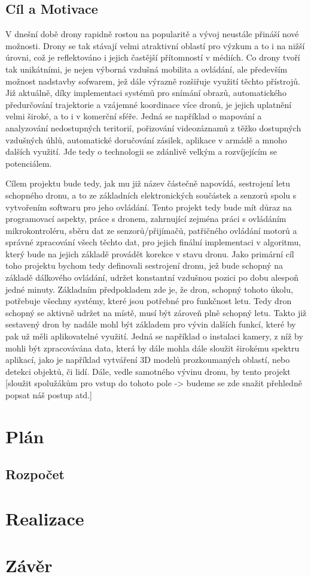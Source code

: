 \documentclass[12pt]{report}
\begin{document}
\section{Cíl a Motivace}
V dnešní době drony rapidně rostou na popularitě a vývoj neustále přináší nové možnosti. Drony se tak stávají velmi atraktivní oblastí pro výzkum a to i na nižší úrovni, což je reflektováno i jejich častější přítomností v médiích. Co drony tvoří tak unikátními, je nejen výborná vzdušná mobilita a ovládání, ale především možnost nadstavby sofwarem, jež dále výrazně rozšiřuje využití těchto přístrojů. Již aktuálně, díky implementaci systémů pro snímání obrazů, automatického předurčování trajektorie a vzájemné koordinace více dronů, je jejich uplatnění velmi široké, a to i v komerční sféře. Jedná se například o mapování a analyzování nedostupných teritorií, pořizování videozáznamů z těžko dostupných vzdušných úhlů, automatické doručování zásilek, aplikace v armádě a mnoho dalších využití. Jde tedy o technologii se zdánlivě velkým a rozvíjejícím se potenciálem.  \par 
Cílem projektu bude tedy, jak mu již název částečně napovídá, sestrojení letu schopného dronu, a to ze základních elektronických součástek a senzorů spolu s vytvořením softwaru pro jeho ovládání. Tento projekt tedy bude mít důraz na programovací aspekty, práce s dronem, zahrnující zejména práci s ovládáním mikrokontroléru, sběru dat ze senzorů/přijímačů, patřičného ovládání motorů a správné zpracování všech těchto dat, pro jejich finální implementaci v algoritmu, který bude na jejich základě provádět korekce v stavu dronu. Jako primární cíl toho projektu bychom tedy definovali sestrojení dronu, jež bude schopný na základě dálkového ovládání, udržet konstantní vzdušnou pozici po dobu alespoň jedné minuty. Základním předpokladem zde je, že dron, schopný tohoto úkolu, potřebuje všechny systémy, které jsou potřebné pro funkčnost letu. Tedy dron schopný se aktivně udržet na místě, musí být zároveň plně schopný letu. Takto již sestavený dron by nadále mohl být základem pro vývin dalších funkcí, které by pak už měli aplikovatelné využití. Jedná se například o instalaci kamery, z níž by mohli být zpracovávána data, která by dále mohla dále sloužit širokému spektru aplikací, jako je například vytváření 3D modelů prozkoumaných oblastí, nebo detekci objektů, či lidí. Dále, vedle samotného vývinu dronu, by tento projekt [sloužit spolužákům pro vstup do tohoto pole -> budeme se zde snažit přehledně popsat náš postup atd.]

\chapter{Plán}
\section{Rozpočet}

\chapter{Realizace}

\chapter{Závěr}
\end{document}
